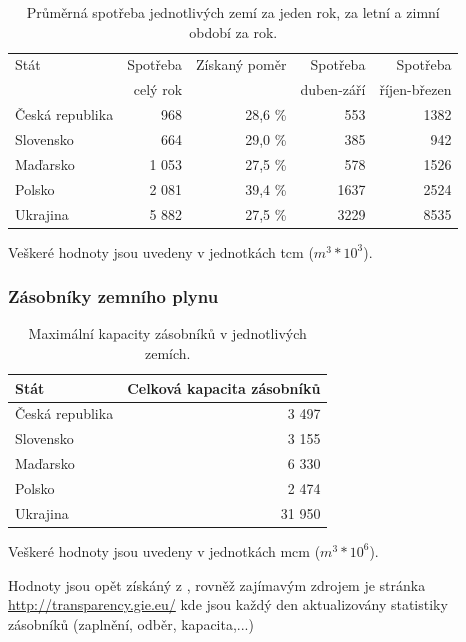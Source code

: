 \documentclass[a4paper,11pt]{article}
\begin{document}
\begin{table}[h!]
\begin{center}
\begin{tabular}{|l|r|r|r|r|}
    \hline
    Stát 			& Spotřeba 	& Získaný poměr & Spotřeba  & Spotřeba \\
    					& celý rok 		&			& duben-září 	& říjen-březen\\
    \hline 
    Česká republika	& 968	& 28,6 \%   	& 553	& 1382\\ 
    Slovensko 		& 664	& 29,0 \%	& 385	& 942\\
    Maďarsko 		& 1 053	& 27,5 \% 	& 578	& 1526\\
    Polsko 			& 2 081	& 39,4 \%	& 1637	& 2524\\
    Ukrajina 		& 5 882	& 27,5 \%	& 3229	& 8535\\
    \hline
\end{tabular}
\caption{Průměrná spotřeba jednotlivých zemí za jeden rok, za letní a zimní období za rok.}
Veškeré hodnoty jsou uvedeny v jednotkách tcm ($m^3 * 10^3$).
\label{spotreba}
\end{center}
\end{table} 

\subsubsection{Zásobníky zemního plynu}\label{zasobniky}

\begin{table}[h!]
\begin{center}
\begin{tabular}{|l|r|}
    \hline
    Stát 			& Celková kapacita zásobníků\\
    \hline 
    Česká republika	& 3 497\\ 
    Slovensko 		& 3 155\\
    Maďarsko 		& 6 330\\
    Polsko 			& 2 474\\
    Ukrajina 		& 31 950\\
    \hline
\end{tabular}
\caption{Maximální kapacity zásobníků v jednotlivých zemích.} 
Veškeré hodnoty jsou uvedeny v jednotkách mcm ($m^3 * 10^6$).
\label{zasobnikytable}
\end{center}
\end{table}

Hodnoty jsou opět získáný z \cite{IEA}, rovněž zajímavým zdrojem je stránka \url{http://transparency.gie.eu/}
kde jsou každý den aktualizovány statistiky zásobníků (zaplnění, odběr, kapacita,...)
\end{document}
